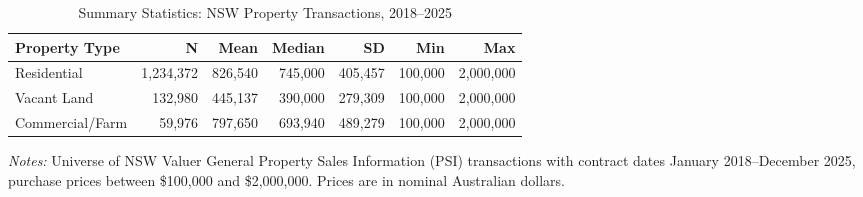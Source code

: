 \begin{table}[htbp]
\centering
\begin{threeparttable}
\caption{Summary Statistics: NSW Property Transactions, 2018--2025}
\label{tab:summary}
\begin{tabular}{lrrrrrr}
\hline\hline
Property Type & N & Mean & Median & SD & Min & Max \\
\hline
Residential & 1,234,372 & 826,540 & 745,000 & 405,457 & 100,000 & 2,000,000 \\
Vacant Land & 132,980 & 445,137 & 390,000 & 279,309 & 100,000 & 2,000,000 \\
Commercial/Farm & 59,976 & 797,650 & 693,940 & 489,279 & 100,000 & 2,000,000 \\
\hline\hline
\end{tabular}
\begin{tablenotes}
\item \textit{Notes:} Universe of NSW Valuer General Property Sales Information (PSI) transactions
with contract dates January 2018--December 2025, purchase prices between \$100,000 and \$2,000,000.
Prices are in nominal Australian dollars.
\end{tablenotes}
\end{threeparttable}
\end{table}
